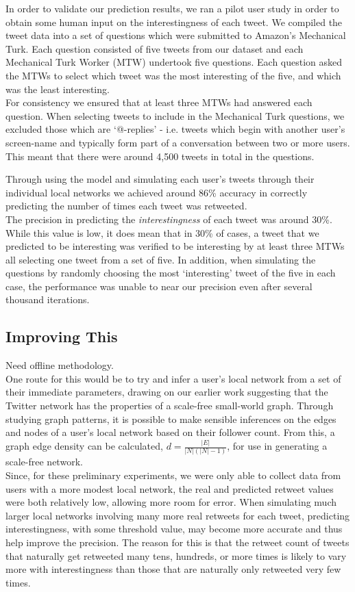 In order to validate our prediction results, we ran a pilot user study in order to obtain some human input on the interestingness of each tweet. We compiled the tweet data into a set of questions which were submitted to Amazon's Mechanical Turk. Each question consisted of five tweets from our dataset and each Mechanical Turk Worker (MTW) undertook five questions. Each question asked the MTWs to select which tweet was the most interesting of the five, and which was the least interesting.
\\
For consistency we ensured that at least three MTWs had answered each question. When selecting tweets to include in the Mechanical Turk questions, we excluded those which are `@-replies' - i.e. tweets which begin with another user's screen-name and typically form part of a conversation between two or more users. This meant that there were around 4,500 tweets in total in the questions.

Through using the model and simulating each user's tweets through their individual local networks we achieved around 86\% accuracy in correctly predicting the number of times each tweet was retweeted. 
\\
The precision in predicting the \textit{interestingness} of each tweet was around 30\%. While this value is low, it does mean that in 30\% of cases, a tweet that we predicted to be interesting was verified to be interesting by at least three MTWs all selecting one tweet from a set of five. In addition, when simulating the questions by randomly choosing the most `interesting' tweet of the five in each case, the performance was unable to near our precision even after several thousand iterations.

\subsection{Improving This}
Need offline methodology.
\\
One route for this would be to try and infer a user's local network from a set of their immediate parameters, drawing on our earlier work suggesting that the Twitter network has the properties of a scale-free small-world graph. Through studying graph patterns, it is possible to make sensible inferences on the edges and nodes of a user's local network based on their follower count. From this, a graph edge density can be calculated, $ d = \frac{|E|}{|N|(|N|-1)} $, for use in generating a scale-free network.
\\
Since, for these preliminary experiments, we were only able to collect data from users with a more modest local network, the real and predicted retweet values were both relatively low, allowing more room for error. When simulating much larger local networks involving many more real retweets for each tweet, predicting interestingness, with some threshold value, may become more accurate and thus help improve the precision. The reason for this is that the retweet count of tweets that naturally get retweeted many tens, hundreds, or more times is likely to vary more with interestingness than those that are naturally only retweeted very few times.


